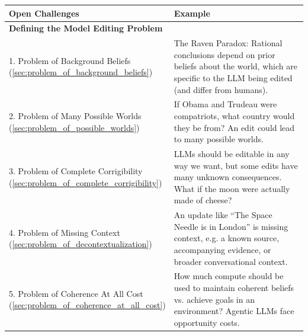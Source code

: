 \documentclass[11pt,a4paper]{article}
\begin{document}
\begin{table}[h!]
\small
\setlength{\tabcolsep}{11pt}
\centering
\small
\begin{tabular}{p{6cm} p{7cm}}
\toprule
\textbf{Open Challenges} & \textbf{Example} \\
\midrule
\textbf{Defining the Model Editing Problem} \\
\hspace{4pt}1. \makecell[tl]{Problem of Background Beliefs \\ (\autoref{sec:problem_of_background_beliefs})} & \hspace{-6pt}\raisebox{1pt}{\scalebox{.7}{\textbullet}} The Raven Paradox: Rational conclusions depend on prior beliefs about the world, which are specific to the LLM being edited (and differ from humans). \\
\addlinespace[1pt]
\addlinespace[1pt]
\hspace{4pt}2. \makecell[tl]{Problem of Many Possible Worlds \\ (\autoref{sec:problem_of_possible_worlds})} &  \hspace{-6pt}\raisebox{1pt}{\scalebox{.7}{\textbullet}} If Obama and Trudeau were compatriots, what country would they be from? An edit could lead to many possible worlds. \\
\addlinespace[1pt]
\hspace{4pt}3. \makecell[tl]{Problem of Complete Corrigibility \\ (\autoref{sec:problem_of_complete_corrigibility})} & \hspace{-6pt}\raisebox{1pt}{\scalebox{.7}{\textbullet}} LLMs should be editable in any way we want, but some edits have many unknown consequences. What if the moon were actually made of cheese? 
\\
\addlinespace[1pt]
\hspace{4pt}4. \makecell[tl]{Problem of Missing Context \\ (\autoref{sec:problem_of_decontextualization})} & \hspace{-6pt}\raisebox{1pt}{\scalebox{.7}{\textbullet}} An update like ``The Space Needle is in London'' is missing context, e.g. a known source, accompanying evidence, or broader conversational context. 
\\
\addlinespace[1pt]
\hspace{4pt}5. \makecell[tl]{Problem of Coherence At All Cost \\ (\autoref{sec:problem_of_coherence_at_all_cost})} & \hspace{-6pt}\raisebox{1pt}{\scalebox{.7}{\textbullet}} How much compute should be used to maintain coherent beliefs vs. achieve goals in an environment? Agentic LLMs face opportunity costs. \\

\end{tabular}
\end{table}
\end{document}
